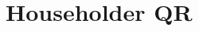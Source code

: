 \documentclass{article}
\newcommand{\R}{\mathbb{R}}
\newcommand{\tth}{\theta}
\newcommand{\bb}[1]{\mathbf{#1}}
\theoremstyle{definition}
\begin{document}
\section{Householder QR}
%
\end{document}
